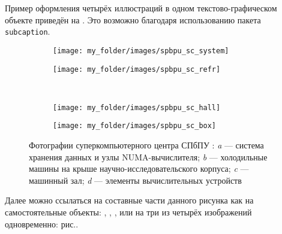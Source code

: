 Пример оформления четырёх иллюстраций в одном текстово-графическом объекте приведён на . Это возможно благодаря использованию пакета \verb|subcaption|.

\begin{figure}[ht]
	\begin{subfigure}[t]{\dimexpr.5\linewidth-1.3em\relax}
		\centering
		\texttt{[image: my\_folder/images/spbpu\_sc\_system]}
	\end{subfigure}
\hfill %
	\begin{subfigure}[t]{\dimexpr.5\linewidth-1.3em\relax}
		\centering
		\texttt{[image: my\_folder/images/spbpu\_sc\_refr]}
	\end{subfigure}
\\[20pt]
\begin{subfigure}[t]{\dimexpr.5\linewidth-1.3em\relax}
	\centering
	\texttt{[image: my\_folder/images/spbpu\_sc\_hall]}
\end{subfigure}%
\hfill %
%
\begin{subfigure}[t]{\dimexpr.5\linewidth-1.3em\relax}
	\centering
	\texttt{[image: my\_folder/images/spbpu\_sc\_box]}
\end{subfigure}
\captionsetup{justification=centering} %
\caption{Фотографии суперкомпьютерного центра СПбПУ \cite{spbpu-gallery}: {\itshape a} --- система хранения данных и узлы NUMA-вычислителя; {\itshape b} --- холодильные машины на крыше научно-исследовательского корпуса; {\itshape c} --- машинный зал; {\itshape d} --- элементы вычислительных устройств}
\label{fig:spbpu_sc-four-photos}
\end{figure}

Далее можно ссылаться на составные части данного рисунка как на самостоятельные объекты: , , ,  или на три из четырёх изображений одновременно: рис..
